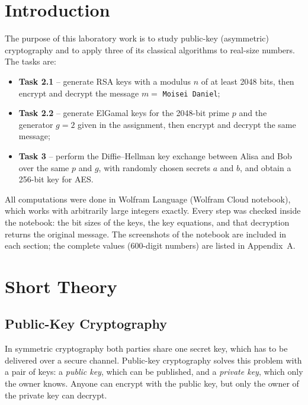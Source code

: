 \documentclass[12pt,a4paper]{article}
\begin{document}
\setcounter{page}{2}
\tableofcontents
\newpage

\section*{Introduction}

The purpose of this laboratory work is to study public-key (asymmetric) cryptography and to apply three of its classical algorithms to real-size numbers. The tasks are:

\begin{itemize}
  \item \textbf{Task 2.1} -- generate RSA keys with a modulus $n$ of at least 2048 bits, then encrypt and decrypt the message $m = $ \texttt{Moisei Daniel};
  \item \textbf{Task 2.2} -- generate ElGamal keys for the 2048-bit prime $p$ and the generator $g = 2$ given in the assignment, then encrypt and decrypt the same message;
  \item \textbf{Task 3} -- perform the Diffie--Hellman key exchange between Alisa and Bob over the same $p$ and $g$, with randomly chosen secrets $a$ and $b$, and obtain a 256-bit key for AES.
\end{itemize}

All computations were done in Wolfram Language (Wolfram Cloud notebook), which works with arbitrarily large integers exactly. Every step was checked inside the notebook: the bit sizes of the keys, the key equations, and that decryption returns the original message. The screenshots of the notebook are included in each section; the complete values (600-digit numbers) are listed in Appendix~A.

\newpage
\section{Short Theory}

\subsection{Public-Key Cryptography}

In symmetric cryptography both parties share one secret key, which has to be delivered over a secure channel. Public-key cryptography solves this problem with a pair of keys: a \emph{public key}, which can be published, and a \emph{private key}, which only the owner knows. Anyone can encrypt with the public key, but only the owner of the private key can decrypt.
\end{document}
